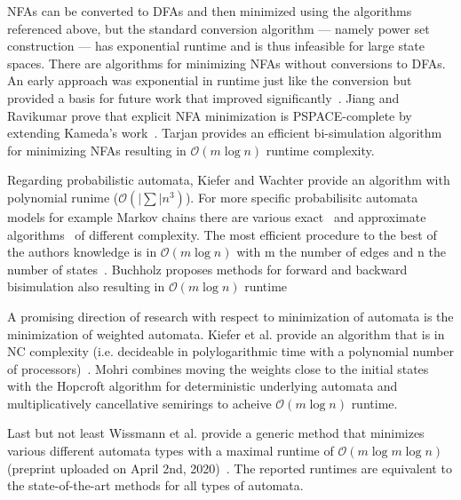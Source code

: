 \documentclass[11pt, rgb]{scrartcl}
\begin{document}
NFAs can be converted to DFAs and then minimized using the algorithms referenced above, but the standard conversion algorithm --- namely power set construction --- has exponential runtime and is thus infeasible for large state spaces. 
There are algorithms for minimizing NFAs without conversions to DFAs. An early approach was exponential in runtime just like the conversion but provided a basis for future work that improved significantly~\autocite{kameda}. 
Jiang and Ravikumar prove that explicit NFA minimization is PSPACE-complete by extending Kameda's work~\autocite{jiang}. 
Tarjan provides an efficient bi-simulation algorithm for minimizing NFAs resulting in $\mathcal{O}(m \log n)$ runtime complexity.

Regarding probabilistic automata, Kiefer and Wachter provide an algorithm with polynomial runime ($\mathcal{O}(|\sum|n^3)$). 
For more specific probabilisitc automata models for example Markov chains there are various exact~\autocite{mc_agg_crn, buchholz, kate} and approximate algorithms~\autocite{geiger, bacci} of different complexity. 
The most efficient procedure to the best of the authors knowledge is in $\mathcal{O}(m \log n)$ with m the number of edges and n the number of states~\autocite{valmari, wissmann}. Buchholz proposes methods for forward and backward bisimulation also resulting in $\mathcal{O}(m \log n)$ runtime~\autocite{buchholz2008bisimulation}

A promising direction of research with respect to minimization of automata is the minimization of weighted automata. 
Kiefer et al. provide an algorithm that is in NC complexity (i.e. decideable in polylogarithmic time with a polynomial number of processors)~\autocite{Kiefer2013OnTC}. Mohri combines moving the weights close to the initial states with the Hopcroft algorithm for deterministic underlying automata and multiplicatively cancellative semirings to acheive $\mathcal{O}(m \log n)$ runtime. 

Last but not least Wissmann et al. provide a generic method that minimizes various different automata types with a maximal runtime of $\mathcal{O}(m \log m \log n)$ (preprint uploaded on April 2nd, 2020)~\autocite{wissmann}. The reported runtimes are equivalent to the state-of-the-art methods for all types of automata.
\end{document}
